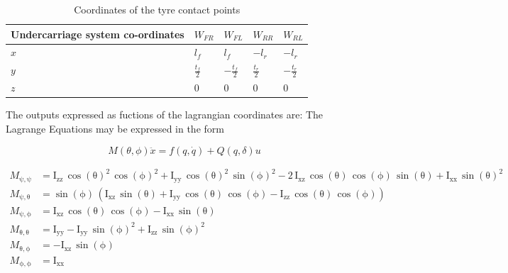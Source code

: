 \begin{table}[ht]
  \caption{Coordinates of the tyre contact points} %
  \centering %
  \begin{tabular}{l l l l l} %
    \hline\hline %
    Undercarriage system co-ordinates & $W_{FR}$ & $W_{FL}$ & $W_{RR}$ & $W_{RL}$ \\ [0.5ex] %
    \hline %
    $ x$ & $ l_f$ & $ l_f$ & $-l_r $ & $-l_r $\\ %
    $ y$ & $ \frac{t_f}{2} $ & $ -\frac{t_f}{2}$ & $ \frac{t_r}{2}$ & $ -\frac{t_r}{2}$\\ %
    $ z$ & $ 0 $& $ 0 $ & $ 0$ & $ 0$ \\ [1ex] %
    \hline %
  \end{tabular}
  \label{table:contactpoints} %
\end{table}

The outputs expressed as fuctions of the lagrangian coordinates are:
The Lagrange Equations may be expressed in the form

$$M(\theta,\phi)\ddot x = f(q, \dot q) + Q(q,\delta)u$$

\begin{align*}
  M_{\mathrm{\psi},\mathrm{\psi}}&=\mathrm{I_{zz}}\,{\cos\left(\mathrm{\theta}\right)}^2\,{\cos\left(\mathrm{\phi}\right)}^2+\mathrm{I_{yy}}\,{\cos\left(\mathrm{\theta}\right)}^2\,{\sin\left(\mathrm{\phi}\right)}^2-2\,\mathrm{I_{xz}}\,\cos\left(\mathrm{\theta}\right)\,\cos\left(\mathrm{\phi}\right)\,\sin\left(\mathrm{\theta}\right)+\mathrm{I_{xx}}\,{\sin\left(\mathrm{\theta}\right)}^2 \\
  M_{\mathrm{\psi},\mathrm{\theta}}&=\sin\left(\mathrm{\phi}\right)\,\left(\mathrm{I_{xz}}\,\sin\left(\mathrm{\theta}\right)+\mathrm{I_{yy}}\,\cos\left(\mathrm{\theta}\right)\,\cos\left(\mathrm{\phi}\right)-\mathrm{I_{zz}}\,\cos\left(\mathrm{\theta}\right)\,\cos\left(\mathrm{\phi}\right)\right) \\
  M_{\mathrm{\psi},\mathrm{\phi}}&=\mathrm{I_{xz}}\,\cos\left(\mathrm{\theta}\right)\,\cos\left(\mathrm{\phi}\right)-\mathrm{I_{xx}}\,\sin\left(\mathrm{\theta}\right) \\
  M_{\mathrm{\theta},\mathrm{\theta}}&=\mathrm{I_{yy}}-\mathrm{I_{yy}}\,{\sin\left(\mathrm{\phi}\right)}^2+\mathrm{I_{zz}}\,{\sin\left(\mathrm{\phi}\right)}^2 \\
  M_{\mathrm{\theta},\mathrm{\phi}}&=-\mathrm{I_{xz}}\,\sin\left(\mathrm{\phi}\right) \\
  M_{\mathrm{\phi},\mathrm{\phi}}&=\mathrm{I_{xx}}
\end{align*}


